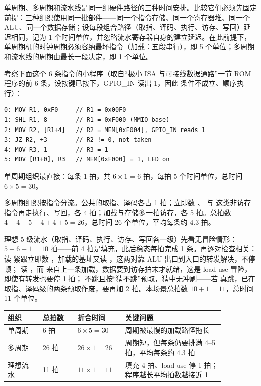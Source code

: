 单周期、多周期和流水线是同一组硬件路径的三种时间安排。比较它们必须先固定前提：三种组织使用同一批部件——同一个指令存储、同一个寄存器堆、同一个 ALU、同一个数据存储；设每段组合路径（取指、译码、执行、访存、写回）延迟相同，记为 1 个时间单位，并忽略流水寄存器自身的建立延迟。在此前提下，单周期机的时钟周期必须容纳最坏指令（加载：五段串行），即 5 个单位；多周期和流水线的周期由最长一段决定，即 1 个单位。

考察下面这个 6 条指令的小程序（取自“极小 ISA 与可接线数据通路”一节 ROM 程序的前 6 条，设按键已按下，GPIO\_IN 读出 1，因此  条件不成立、顺序执行）：

\begin{lstlisting}
0: MOV R1, 0xF0     // R1 = 0x00F0
1: SHL R1, 8        // R1 = 0xF000 (MMIO base)
2: MOV R2, [R1+4]   // R2 = MEM[0xF004], GPIO_IN reads 1
3: JZ R2, +3        // R2 != 0, not taken
4: MOV R3, 1        // R3 = 1
5: MOV [R1+0], R3   // MEM[0xF000] = 1, LED on
\end{lstlisting}

单周期组织最直接：每条 1 拍，共 $6\times1=6$ 拍，每拍 5 个时间单位，总时间 $6\times5=30$。

多周期组织按指令分流。公共的取指、译码各占 1 拍；立即数 、 与  这类非访存指令再走执行、写回，各 4 拍；加载与存储多一拍访存，各 5 拍。总拍数 $4+4+5+4+4+5=26$，总时间 26 个单位，平均每条约 4.3 拍。

理想 5 级流水（取指、译码、执行、访存、写回各一级）先看无冒险情形：$5+6-1=10$ 拍——前 4 拍是填充，此后稳态每拍完成 1 条。再逐对检查相关： 读  紧跟立即数 ，加载的基址又读 ，这两对靠 ALU 出口到入口的转发解决，不停顿； 读 ，而  来自上一条加载，数据要到访存拍末才就绪，这是 load-use 冒险，即使有转发也要停 1 拍； 不跳且按“猜不跳”预取，猜中无冲刷——若  真跳，已在取指、译码级的两条预取作废，要再加 2 拍。本场景总拍数 $10+1=11$，总时间 11 个单位。

\begin{longtable}{L{0.14\linewidth}L{0.14\linewidth}L{0.18\linewidth}L{0.4\linewidth}}
\toprule
组织 & 总拍数 & 折合时间 & 关键问题 \\
\midrule
单周期 & 6 拍 & $6\times5=30$ & 周期被最慢的加载路径拖长 \\\tablerowrule
多周期 & 26 拍 & $26\times1=26$ & 周期短，但每条仍要排满 4–5 拍，平均每条约 4.3 拍 \\\tablerowrule
理想流水 & 11 拍 & $11\times1=11$ & 填充 4 拍、load-use 停 1 拍；程序越长平均拍数越接近 1 \\
\bottomrule
\end{longtable}

